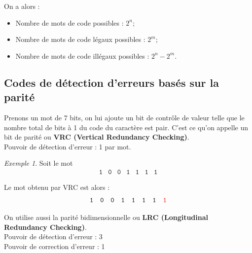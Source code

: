 \documentclass[11pt,english,french]{scrreprt}
\theoremstyle{remark}
\newtheorem*{ex*}{Exemple}
\theoremstyle{definition}
\begin{document}
On a alors :\begin{itemize}
	\item Nombre de mots de code possibles : $2^n$;
	\item Nombre de mots de code légaux possibles : $2^m$;
	\item Nombre de mots de code illégaux possibles : $2^n - 2^m$.
	
\end{itemize}

\subsection{Codes de détection d'erreurs basés sur la parité} %

Prenons un mot de 7 bits, on lui ajoute un bit de contrôle de valeur telle que le nombre total de bits à 1 du code du caractère est pair. C'est ce qu'on appelle un bit de parité ou \textbf{VRC (Vertical Redundancy Checking)}.\\
Pouvoir de détection d'erreur : 1 par mot.
\begin{ex*}
	Soit le mot 
	\[
		\begin{array}{ccccccc}
		\mathtt{1} & \mathtt{0} & \mathtt{0} & \mathtt{1} & \mathtt{1} & \mathtt{1} & \mathtt{1}\end{array}
	\]
	
	Le mot obtenu par VRC est alors : 
	\[
		\begin{array}{cccccccc}
		\mathtt{1} & \mathtt{0} & \mathtt{0} & \mathtt{1} & \mathtt{1} & \mathtt{1} & \mathtt{1} & \mathtt{{\color{red}1}}\end{array}
	\]
\end{ex*}

On utilise aussi la parité bidimensionnelle ou \textbf{LRC (Longitudinal Redundancy Checking)}.\\
Pouvoir de détection d'erreur : 3\\
Pouvoir de correction d'erreur : 1
\end{document}
